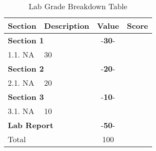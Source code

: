\documentclass{article}
\begin{document}
\begin{table}[!htb]
  \begin{center}
    \begin{tabular}[width=0.8\textwidth]{|l|l|c|l|}
       \hline
       Section & Description & Value & Score\\
       \hline 
       \multicolumn{2}{|l}{\textbf{Section 1}}  & -\textbf{30}- &\\
       \hline
       1.1. NA & 30 &\\
       \hline
       \multicolumn{2}{|l}{\textbf{Section 2}}  & -\textbf{20}- &\\
       \hline
       2.1. NA & 20 &\\
       \hline
       \multicolumn{2}{|l}{\textbf{Section 3}}  & -\textbf{10}- &\\
       \hline
       3.1. NA & 10 &\\
       \hline
       \multicolumn{2}{|l}{\textbf{Lab Report}}  & -\textbf{50}- &\\
       \hline
       \hline
       \multicolumn{2}{|l}{Total} & \multicolumn{1}{c|}{100} &\\
       \hline
    \end{tabular}
  \end{center}
  \caption{Lab Grade Breakdown Table}
\end{table}
\end{document}
